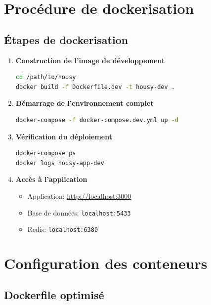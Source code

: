 \documentclass[12pt,a4paper]{report}
\begin{document}
\section{Procédure de dockerisation}

\subsection{Étapes de dockerisation}

\begin{enumerate}
    \item \textbf{Construction de l'image de développement}
    \begin{lstlisting}[language=bash]
cd /path/to/housy
docker build -f Dockerfile.dev -t housy-dev .
    \end{lstlisting}
    
    \item \textbf{Démarrage de l'environnement complet}
    \begin{lstlisting}[language=bash]
docker-compose -f docker-compose.dev.yml up -d
    \end{lstlisting}
    
    \item \textbf{Vérification du déploiement}
    \begin{lstlisting}[language=bash]
docker-compose ps
docker logs housy-app-dev
    \end{lstlisting}
    
    \item \textbf{Accès à l'application}
    \begin{itemize}
        \item Application: \url{http://localhost:3000}
        \item Base de données: \texttt{localhost:5433}
        \item Redis: \texttt{localhost:6380}
    \end{itemize}
\end{enumerate}

\section{Configuration des conteneurs}

\subsection{Dockerfile optimisé}
\end{document}
